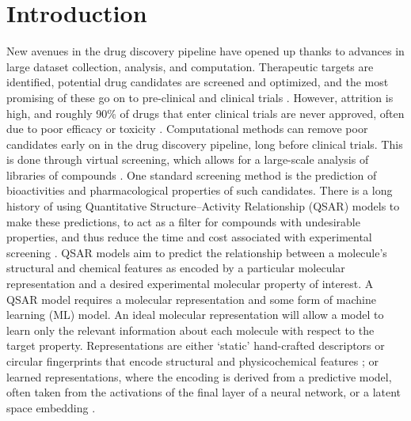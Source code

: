 
\chapter{Introduction}\label{chap:intro}

New avenues in the drug discovery pipeline have opened up thanks to advances in large dataset collection, analysis, and computation. Therapeutic targets are identified, potential drug candidates are screened and optimized, and the most promising of these go on to pre-clinical and clinical trials \citep{Hughes2011}. However, attrition is high, and roughly 90\% of drugs that enter clinical trials are never approved, often due to poor efficacy or toxicity \citep{Sun2022}. Computational methods can remove poor candidates early on in the drug discovery pipeline, long before clinical trials. This is done through virtual screening, which allows for a large-scale analysis of libraries of compounds \citep{Neves2018}. One standard screening method is the prediction of bioactivities and pharmacological properties of such candidates. There is a long history of using Quantitative Structure--Activity Relationship (QSAR) models to make these predictions, to act as a filter for compounds with undesirable properties, and thus reduce the time and cost associated with experimental screening \citep{Sabando2021}. QSAR models aim to predict the relationship between a molecule's structural and chemical features as encoded by a particular molecular representation and a desired experimental molecular property \citep{Sabando2021} of interest. A QSAR model requires a molecular representation and some form of machine learning (ML) model. An ideal molecular representation will allow a model to learn only the relevant information about each molecule with respect to the target property. Representations are either `static' hand-crafted descriptors or circular fingerprints that encode structural and physicochemical features \citep{rogers2010, David2020, sns, Gedeck2006}; or learned representations, where the encoding is derived from a predictive model, often taken from the activations of the final layer of a neural network, or a latent space embedding \citep{Sabando2021, kishimoto2023}. 

